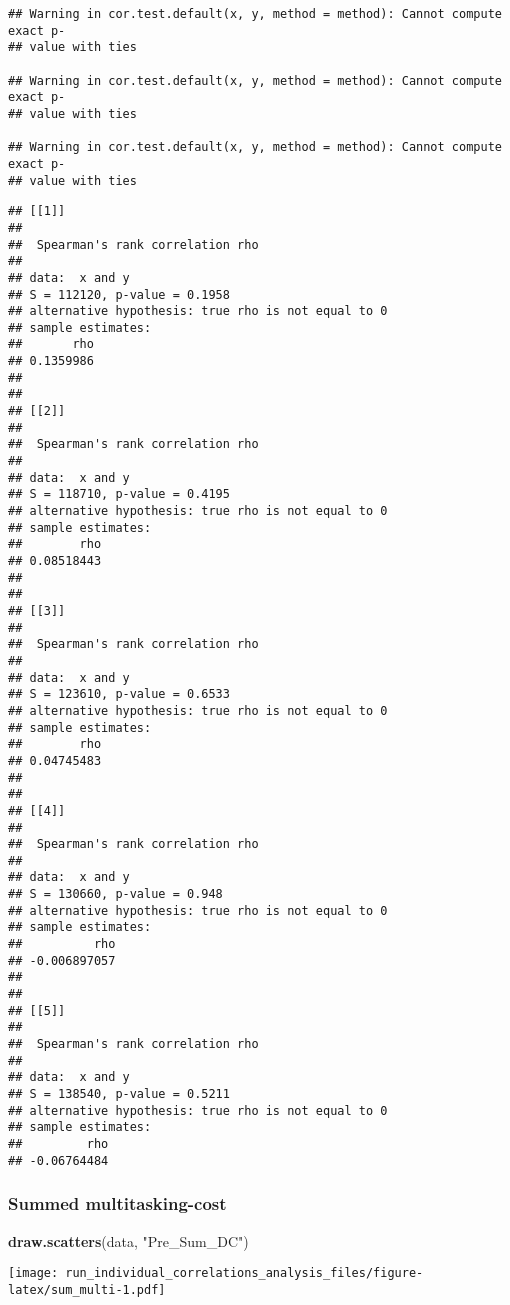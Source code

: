 \documentclass[]{article}
\newenvironment{Shaded}{\begin{snugshade}}{\end{snugshade}}
\newcommand{\KeywordTok}[1]{\textcolor[rgb]{0.13,0.29,0.53}{\textbf{#1}}}
\newcommand{\DataTypeTok}[1]{\textcolor[rgb]{0.13,0.29,0.53}{#1}}
\newcommand{\StringTok}[1]{\textcolor[rgb]{0.31,0.60,0.02}{#1}}
\newcommand{\OperatorTok}[1]{\textcolor[rgb]{0.81,0.36,0.00}{\textbf{#1}}}
\newcommand{\NormalTok}[1]{#1}
\begin{document}
\begin{verbatim}
## Warning in cor.test.default(x, y, method = method): Cannot compute exact p-
## value with ties

## Warning in cor.test.default(x, y, method = method): Cannot compute exact p-
## value with ties

## Warning in cor.test.default(x, y, method = method): Cannot compute exact p-
## value with ties
\end{verbatim}

\begin{verbatim}
## [[1]]
## 
##  Spearman's rank correlation rho
## 
## data:  x and y
## S = 112120, p-value = 0.1958
## alternative hypothesis: true rho is not equal to 0
## sample estimates:
##       rho 
## 0.1359986 
## 
## 
## [[2]]
## 
##  Spearman's rank correlation rho
## 
## data:  x and y
## S = 118710, p-value = 0.4195
## alternative hypothesis: true rho is not equal to 0
## sample estimates:
##        rho 
## 0.08518443 
## 
## 
## [[3]]
## 
##  Spearman's rank correlation rho
## 
## data:  x and y
## S = 123610, p-value = 0.6533
## alternative hypothesis: true rho is not equal to 0
## sample estimates:
##        rho 
## 0.04745483 
## 
## 
## [[4]]
## 
##  Spearman's rank correlation rho
## 
## data:  x and y
## S = 130660, p-value = 0.948
## alternative hypothesis: true rho is not equal to 0
## sample estimates:
##          rho 
## -0.006897057 
## 
## 
## [[5]]
## 
##  Spearman's rank correlation rho
## 
## data:  x and y
## S = 138540, p-value = 0.5211
## alternative hypothesis: true rho is not equal to 0
## sample estimates:
##         rho 
## -0.06764484
\end{verbatim}

\subsubsection{Summed multitasking-cost}\label{summed-multitasking-cost}

\begin{Shaded}
\begin{Highlighting}[]
\KeywordTok{draw.scatters}\NormalTok{(data, }\StringTok{"Pre_Sum_DC"}\NormalTok{)}
\end{Highlighting}
\end{Shaded}

\texttt{[image: run\_individual\_correlations\_analysis\_files/figure-latex/sum\_multi-1.pdf]}

\begin{Shaded}
\end{Shaded}
\end{document}
